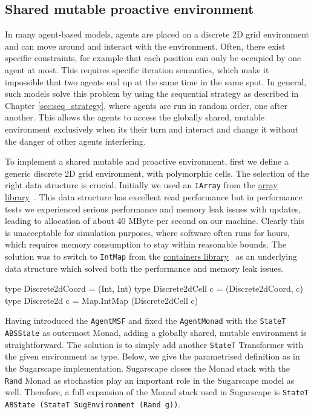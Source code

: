 \subsection{Shared mutable proactive environment}
In many agent-based models, agents are placed on a discrete 2D grid environment and can move around and interact with the environment. Often, there exist specific constraints, for example that each position can only be occupied by one agent at most. This requires specific iteration semantics, which make it impossible that two agents end up at the same time in the same spot. In general, such models solve this problem by using the sequential strategy as described in Chapter \ref{sec:seq_strategy}, where agents are run in random order, one after another. This allows the agents to access the globally shared, mutable environment exclusively when its their turn and interact and change it without the danger of other agents interfering.

To implement a shared mutable and proactive environment, first we define a generic discrete 2D grid environment, with polymorphic cells. The selection of the right data structure is crucial. Initially we used an \texttt{IArray} from the \href{http://hackage.haskell.org/package/array}{array library}~\cite{array_library}. This data structure has excellent read performance but in performance tests we experienced serious performance and memory leak issues with updates, leading to allocation of about 40 MByte per second on our machine. Clearly this is unacceptable for simulation purposes, where software often runs for hours, which requires memory consumption to stay within reasonable bounds. The solution was to switch to \texttt{IntMap} from the \href{http://hackage.haskell.org/package/containers}{containers library}~\cite{containers_library} as an underlying data structure which solved both the performance and memory leak issues.

\begin{HaskellCode}
type Discrete2dCoord  = (Int, Int)
type Discrete2dCell c = (Discrete2dCoord, c)
type Discrete2d c     = Map.IntMap (Discrete2dCell c)
\end{HaskellCode}

Having introduced the \texttt{AgentMSF} and fixed the \texttt{AgentMonad} with the \texttt{StateT ABSState} as outermost Monad, adding a globally shared, mutable environment is straightforward. The solution is to simply add another \texttt{StateT} Transformer with the given environment as type. Below, we give the parametrised definition as in the Sugarscape implementation. Sugarscape closes the Monad stack with the \texttt{Rand} Monad as stochastics play an important role in the Sugarscape model as well. Therefore, a full expansion of the Monad stack used in Sugarscape is \texttt{StateT ABState (StateT SugEnvironment (Rand g))}.

